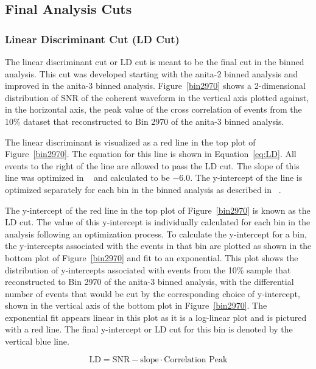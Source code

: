 \subsection{Final Analysis Cuts} \label{subsec:facuts}

\subsubsection{Linear Discriminant Cut (LD Cut)}

The linear discriminant cut or LD cut is meant to be the final cut in the binned analysis. This cut was developed starting with the \gls{anita}-2 binned analysis and improved in the \gls{anita}-3 binned analysis. Figure~\ref{bin2970} shows a 2-dimensional distribution of SNR of the coherent waveform in the vertical axis plotted against, in the horizontal axis, the peak value of the cross correlation of events from the 10\% dataset that reconstructed to Bin 2970 of the \gls{anita}-3 binned analysis.

The linear discriminant is visualized as a red line in the top plot of Figure~\ref{bin2970}. The equation for this line is shown in Equation~\ref{eq:LD}. All events to the right of the line are allowed to pass the LD cut.
The slope of this line was optimized in ~\cite{samStaffordThesis} and calculated to be $-6.0$.  
The y-intercept of the line is optimized separately for 
each bin in the binned analysis as described in ~\cite{diffuse,brianDaileyThesis,samStaffordThesis,jacobGordonThesis}. 

The y-intercept of the red line in the top plot of Figure~\ref{bin2970} is known as the LD cut. The value of this y-intercept is individually calculated for each bin in the analysis following an optimization process.
To calculate the y-intercept for a bin, the y-intercepts associated with the events in that bin are plotted as shown in the bottom plot of Figure~\ref{bin2970} and fit to an exponential. This plot shows the distribution of y-intercepts associated with events from the 10\% sample that reconstructed to Bin 2970 of the \gls{anita}-3 binned analysis, with the differential number of events that would be cut by the corresponding choice of y-intercept, shown in the vertical axis of the bottom plot in Figure~\ref{bin2970}. The exponential fit appears linear in this plot as it is a log-linear plot and is pictured with a red line. The final y-intercept or LD cut for this bin is denoted by the vertical blue line. 
 
\begin{equation} \label{eq:LD}
\textrm{LD} = \textrm{SNR} - \textrm{slope} \cdot \textrm{Correlation Peak} 
\end{equation}

